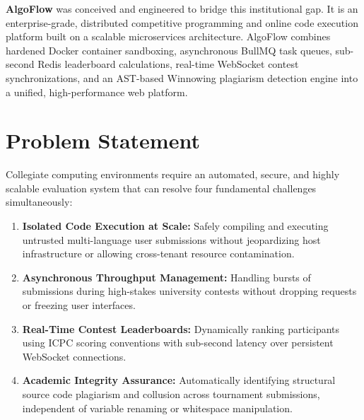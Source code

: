 \documentclass[12pt,a4paper]{report}
\begin{document}
\textbf{AlgoFlow} was conceived and engineered to bridge this institutional gap. It is an enterprise-grade, distributed competitive programming and online code execution platform built on a scalable microservices architecture. AlgoFlow combines hardened Docker container sandboxing, asynchronous BullMQ task queues, sub-second Redis leaderboard calculations, real-time WebSocket contest synchronizations, and an AST-based Winnowing plagiarism detection engine into a unified, high-performance web platform.

\section{Problem Statement}
Collegiate computing environments require an automated, secure, and highly scalable evaluation system that can resolve four fundamental challenges simultaneously:
\begin{enumerate}[leftmargin=*, label=\bfseries\arabic*.]
  \item \textbf{Isolated Code Execution at Scale:} Safely compiling and executing untrusted multi-language user submissions without jeopardizing host infrastructure or allowing cross-tenant resource contamination.
  \item \textbf{Asynchronous Throughput Management:} Handling bursts of submissions during high-stakes university contests without dropping requests or freezing user interfaces.
  \item \textbf{Real-Time Contest Leaderboards:} Dynamically ranking participants using ICPC scoring conventions with sub-second latency over persistent WebSocket connections.
  \item \textbf{Academic Integrity Assurance:} Automatically identifying structural source code plagiarism and collusion across tournament submissions, independent of variable renaming or whitespace manipulation.
\end{enumerate}
\end{document}
